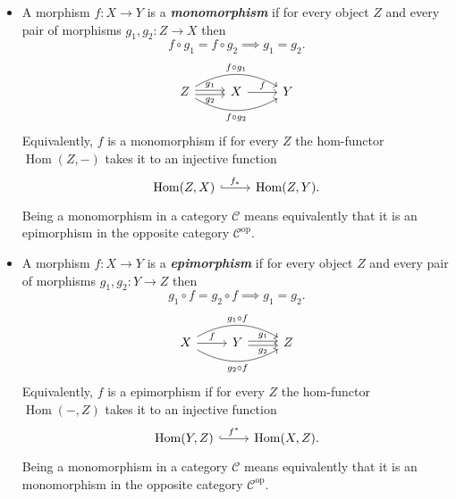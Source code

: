 \documentclass{article}
\numberwithin{equation}{section}
\newcommand{\Cc}{\mathcal{C}}
\DeclareMathOperator{\Hom}{Hom}
\DeclareMathOperator{\op}{op}
\begin{document}
\begin{defn}
\begin{itemize}
		\item A morphism $f:X\to Y$ is a \textbf{\textit{monomorphism}} if for every object $Z$ and every pair of morphisms $g_1,g_2:Z\to X$ then
		\[f\circ g_1=f\circ g_2\implies g_1=g_2.\]
		\[\begin{tikzcd}
			Z\arrow[r,shift={(0,.06)},"g_1"]\arrow[r,swap,shift={(0,-.06)},"g_2"]\arrow[rr,bend left,"f\circ g_1"]\arrow[rr,bend right,swap,"f\circ g_2"]&X\arrow[r,"f"]&Y
		\end{tikzcd}\]
		Equivalently, $f$ is a monomorphism if for every $Z$ the hom-functor $\Hom(Z,-)$ takes it to an injective function
		\[\begin{tikzcd}
			\Hom(Z,X)\arrow[r,hook,"f_*"]&\Hom(Z,Y).
		\end{tikzcd}\]
		Being a monomorphism in a category $\Cc$ means equivalently that it is an epimorphism in the opposite category $\Cc^{\op}$.
		
		\item A morphism $f:X\to Y$ is a \textbf{\textit{epimorphism}} if for every object $Z$ and every pair of morphisms $g_1,g_2:Y\to Z$ then
		\[g_1\circ f=g_2\circ f\implies g_1=g_2.\]
		\[\begin{tikzcd}
			X\arrow[r,"f"]\arrow[rr,bend right,swap,"g_2\circ f"]\arrow[rr,bend left,"g_1\circ f"]&Y\arrow[r,shift={(0,.06)},"g_1"]\arrow[r,swap,shift={(0,-.06)},"g_2"]&Z
		\end{tikzcd}\]
		Equivalently, $f$ is a epimorphism if for every $Z$ the hom-functor $\Hom(-,Z)$ takes it to an injective function
		\[\begin{tikzcd}
			\Hom(Y,Z)\arrow[r,hook,"f^*"]&\Hom(X,Z).
		\end{tikzcd}\]
		Being a monomorphism in a category $\Cc$ means equivalently that it is an monomorphism in the opposite category $\Cc^{\op}$.
	\end{itemize}
\end{defn}
\end{document}
